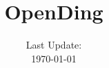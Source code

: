 \documentclass{article}
\title{OpenDing}
\date{Last Update:\\ \today}
\begin{document}
\maketitle
\newcommand{\dir}{./songs}
\newcommand{\inputSongs}[1]{ \newpage}


\newpage

\tableofcontents

\newpage


	\inputSongs{beatles}
	\inputSongs{jointVenture}
\end{document}
